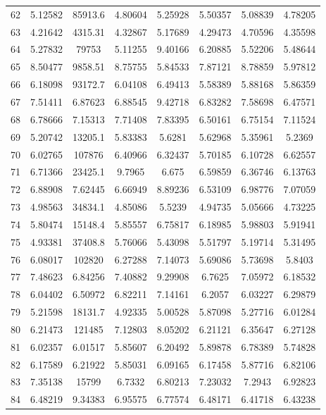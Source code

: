 \begin{center}
\begin{longtable}{cccccccc}
62 & 5.12582 & 85913.6 & 4.80604 & 5.25928 & 5.50357 & 5.08839 & 4.78205\\
63 & 4.21642 & 4315.31 & 4.32867 & 5.17689 & 4.29473 & 4.70596 & 4.35598\\
64 & 5.27832 & 79753 & 5.11255 & 9.40166 & 6.20885 & 5.52206 & 5.48644\\
65 & 8.50477 & 9858.51 & 8.75755 & 5.84533 & 7.87121 & 8.78859 & 5.97812\\
66 & 6.18098 & 93172.7 & 6.04108 & 6.49413 & 5.58389 & 5.88168 & 5.86359\\
67 & 7.51411 & 6.87623 & 6.88545 & 9.42718 & 6.83282 & 7.58698 & 6.47571\\
68 & 6.78666 & 7.15313 & 7.71408 & 7.83395 & 6.50161 & 6.75154 & 7.11524\\
69 & 5.20742 & 13205.1 & 5.83383 & 5.6281 & 5.62968 & 5.35961 & 5.2369\\
70 & 6.02765 & 107876 & 6.40966 & 6.32437 & 5.70185 & 6.10728 & 6.62557\\
71 & 6.71366 & 23425.1 & 9.7965 & 6.675 & 6.59859 & 6.36746 & 6.13763\\
72 & 6.88908 & 7.62445 & 6.66949 & 8.89236 & 6.53109 & 6.98776 & 7.07059\\
73 & 4.98563 & 34834.1 & 4.85086 & 5.5239 & 4.94735 & 5.05666 & 4.73225\\
74 & 5.80474 & 15148.4 & 5.85557 & 6.75817 & 6.18985 & 5.98803 & 5.91941\\
75 & 4.93381 & 37408.8 & 5.76066 & 5.43098 & 5.51797 & 5.19714 & 5.31495\\
76 & 6.08017 & 102820 & 6.27288 & 7.14073 & 5.69086 & 5.73698 & 5.8403\\
77 & 7.48623 & 6.84256 & 7.40882 & 9.29908 & 6.7625 & 7.05972 & 6.18532\\
78 & 6.04402 & 6.50972 & 6.82211 & 7.14161 & 6.2057 & 6.03227 & 6.29879\\
79 & 5.21598 & 18131.7 & 4.92335 & 5.00528 & 5.87098 & 5.27716 & 6.01284\\
80 & 6.21473 & 121485 & 7.12803 & 8.05202 & 6.21121 & 6.35647 & 6.27128\\
81 & 6.02357 & 6.01517 & 5.85607 & 6.20492 & 5.89878 & 6.78389 & 5.74828\\
82 & 6.17589 & 6.21922 & 5.85031 & 6.09165 & 6.17458 & 5.87716 & 6.82106\\
83 & 7.35138 & 15799 & 6.7332 & 6.80213 & 7.23032 & 7.2943 & 6.92823\\
84 & 6.48219 & 9.34383 & 6.95575 & 6.77574 & 6.48171 & 6.41718 & 6.43238\\

\end{longtable}
\end{center}

